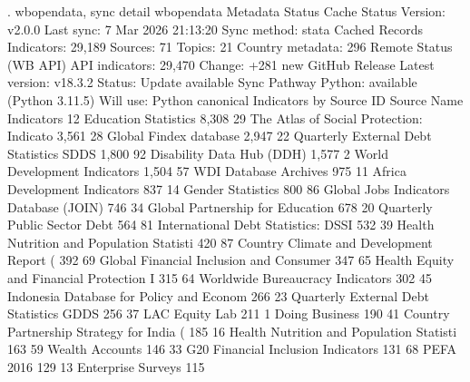 . wbopendata, sync detail
{\smallskip}
wbopendata Metadata Status
{\smallskip}
  Cache Status
  Version:          v2.0.0
  Last sync:        7 Mar 2026 21:13:20
  Sync method:      stata
{\smallskip}
  Cached Records
  Indicators:          29,189
  Sources:                 71
  Topics:                  21
  Country metadata:       296
{\smallskip}
  Remote Status (WB API)
  API indicators:      29,470
  Change:           +281 new
{\smallskip}
  GitHub Release
  Latest version:   v18.3.2
  Status:           Update available
{\smallskip}
  Sync Pathway
  Python:           available (Python 3.11.5)
  Will use:         Python canonical
{\smallskip}
  Indicators by Source
{\smallskip}
   ID    Source Name                                  Indicators
   12    Education Statistics                            8,308
   29    The Atlas of Social Protection: Indicato        3,561
   28    Global Findex database                          2,947
   22    Quarterly External Debt Statistics SDDS         1,800
   92    Disability Data Hub (DDH)                       1,577
   2     World Development Indicators                    1,504
   57    WDI Database Archives                             975
   11    Africa Development Indicators                     837
   14    Gender Statistics                                 800
   86    Global Jobs Indicators Database (JOIN)            746
   34    Global Partnership for Education                  678
   20    Quarterly Public Sector Debt                      564
   81     International Debt Statistics: DSSI              532
   39    Health Nutrition and Population Statisti          420
   87    Country Climate and Development Report (          392
   69    Global Financial Inclusion and Consumer           347
   65    Health Equity and Financial Protection I          315
   64    Worldwide Bureaucracy Indicators                  302
   45    Indonesia Database for Policy and Econom          266
   23    Quarterly External Debt Statistics GDDS           256
   37    LAC Equity Lab                                    211
   1     Doing Business                                    190
   41    Country Partnership Strategy for India (          185
   16    Health Nutrition and Population Statisti          163
   59    Wealth Accounts                                   146
   33    G20 Financial Inclusion Indicators                131
   68    PEFA 2016                                         129
   13    Enterprise Surveys                                115
